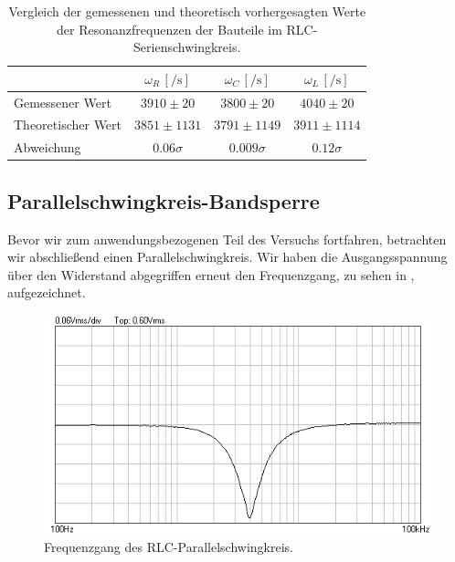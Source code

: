 \renewcommand{\arraystretch}{1.5}
\begin{table}[H]
  \centering
  \caption{Vergleich der gemessenen und theoretisch vorhergesagten Werte der Resonanzfrequenzen der Bauteile im RLC-Serienschwingkreis.}\vspace*{0.5em}
  \label{tab:omega_vergleich}
  \begin{tabular}{|l|c|c|c|}
    \hline
    & $\omega_R\,[\si{\per\second}]$ & $\omega_C\,[\si{\per\second}]$ & $\omega_L\,[\si{\per\second}]$\\\hline
    Gemessener Wert & $3910 \pm 20$ & $3800 \pm 20$ & $4040 \pm 20$ \\\hline
    Theoretischer Wert & $3851 \pm 1131$ & $3791 \pm 1149$ & $3911 \pm 1114$\\\hline\hline
    Abweichung & $0.06\sigma$ & $0.009\sigma$ & $0.12\sigma$\\
    \hline
  \end{tabular}
\end{table}
\renewcommand{\arraystretch}{1}

\subsection{Parallelschwingkreis-Bandsperre}

Bevor wir zum anwendungsbezogenen Teil des Versuchs fortfahren, betrachten wir abschließend einen Parallelschwingkreis. Wir haben die Ausgangsspannung über den Widerstand abgegriffen erneut den Frequenzgang, zu sehen in , aufgezeichnet.


\begin{figure}[H]
  \centering
  \includegraphics[width=.8\textwidth]{files/aufgabe7_parallel_bandsperre.png}
  \caption{Frequenzgang des RLC-Parallelschwingkreis.}
  \label{fig:aufgabe7_parallel_bandsperre}
\end{figure}

